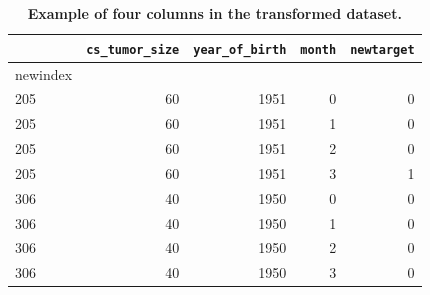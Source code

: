 \documentclass[10pt,letterpaper]{article}
\newcommand{\codewhite}[1]{\colorbox{white}{\texttt{#1}}}
\begin{document}
\begin{table}[H]
\begin{adjustwidth}{-2.25in}{0in} %
\caption{\label{tab:transformeddead} {\bf Example of four columns in the transformed dataset.}}
\begin{tabular}{lrrrr}
\toprule
{} &  \codewhite{cs\_tumor\_size} &  \codewhite{year\_of\_birth} &  \codewhite{month} &  \codewhite{newtarget} \\
\midrule
newindex &                &                &        &            \\
205      &             60 &           1951 &      0 &          0 \\
205      &             60 &           1951 &      1 &          0 \\
205      &             60 &           1951 &      2 &          0 \\
205      &             60 &           1951 &      3 &          1 \\
306      &             40 &           1950 &      0 &          0 \\
306      &             40 &           1950 &      1 &          0 \\
306      &             40 &           1950 &      2 &          0  \\
306      &             40 &           1950 &      3 &          0  \\
\bottomrule
\end{tabular}
\end{adjustwidth}
\end{table}
\end{document}
